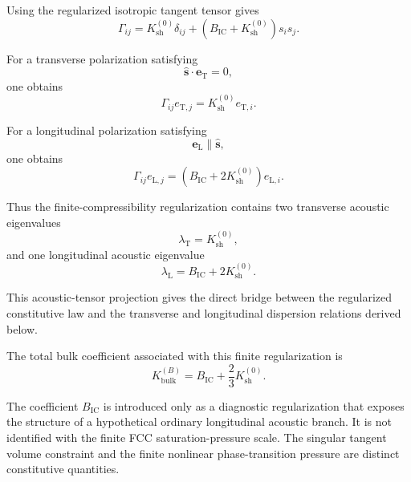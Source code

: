 Using the regularized isotropic tangent tensor gives
\begin{equation}
    \Gamma_{ij} = K_{\mathrm{sh}}^{(0)}\delta_{ij} + \left(B_{\mathrm{IC}}+K_{\mathrm{sh}}^{(0)}\right)s_{i}s_{j}.
\end{equation}

For a transverse polarization satisfying
\begin{equation}
    \hat{\mathbf{s}}\cdot\mathbf{e}_{\mathrm{T}} = 0,
\end{equation}
one obtains
\begin{equation}
    \Gamma_{ij}e_{\mathrm{T},j} = K_{\mathrm{sh}}^{(0)}e_{\mathrm{T},i}.
\end{equation}

For a longitudinal polarization satisfying
\begin{equation}
    \mathbf{e}_{\mathrm{L}}\parallel\hat{\mathbf{s}},
\end{equation}
one obtains
\begin{equation}
    \Gamma_{ij}e_{\mathrm{L},j} = \left(B_{\mathrm{IC}}+2K_{\mathrm{sh}}^{(0)}\right)e_{\mathrm{L},i}.
\end{equation}

Thus the finite-compressibility regularization contains two transverse acoustic eigenvalues
\begin{equation}
    \lambda_{\mathrm{T}} = K_{\mathrm{sh}}^{(0)},
\end{equation}
and one longitudinal acoustic eigenvalue
\begin{equation}
    \lambda_{\mathrm{L}} = B_{\mathrm{IC}} + 2K_{\mathrm{sh}}^{(0)}.
\end{equation}

This acoustic-tensor projection gives the direct bridge between the regularized constitutive law and the transverse and longitudinal dispersion relations derived below.

The total bulk coefficient associated with this finite regularization is
\begin{equation}
    K_{\mathrm{bulk}}^{(B)} = B_{\mathrm{IC}} + \frac{2}{3}K_{\mathrm{sh}}^{(0)}.
\end{equation}

The coefficient $B_{\mathrm{IC}}$ is introduced only as a diagnostic regularization that exposes the structure of a hypothetical ordinary longitudinal acoustic branch. It is not identified with the finite FCC saturation-pressure scale. The singular tangent volume constraint and the finite nonlinear phase-transition pressure are distinct constitutive quantities.


